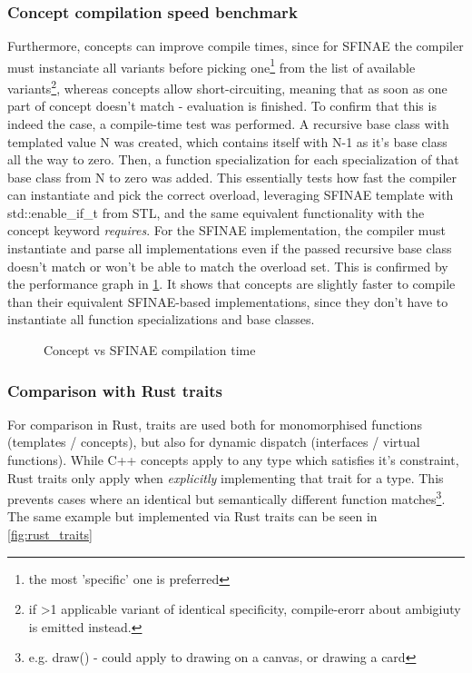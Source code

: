 \documentclass[
    english, %
]{VUMIFPSkursinis}
\begin{document}
\FloatBarrier
\subsubsection{Concept compilation speed benchmark}

Furthermore, concepts can improve compile times, since for SFINAE the compiler must instanciate all variants before picking one\footnote{the most 'specific' one is preferred} from the list of available variants\footnote{if >1 applicable variant of identical specificity, compile-erorr about ambigiuty is emitted instead.}, whereas concepts allow short-circuiting, meaning that as soon as one part of concept doesn't match - evaluation is finished. To confirm that this is indeed the case, a compile-time test was performed. A recursive base class with templated value N was created, which contains itself with N-1 as it's base class all the way to zero. Then, a function specialization for each specialization of that base class from N to zero was added. This essentially tests how fast the compiler can instantiate and pick the correct overload, leveraging SFINAE template with std::enable\_if\_t from STL, and the same equivalent functionality with the concept keyword \textit{requires}. For the SFINAE implementation, the compiler must instantiate and parse all implementations even if the passed recursive base class doesn't match or won't be able to match the overload set. This is confirmed by the performance graph in \cref{fig:concept_performance}. It shows that concepts are slightly faster to compile than their equivalent SFINAE-based implementations, since they don't have to instantiate all function specializations and base classes.

\begin{figure}[!htbp]
    \begin{center}
        \scalebox{.9}{
            
        }
    \end{center}
    \caption{Concept vs SFINAE compilation time}
    \label{fig:concept_performance}
\end{figure}

\FloatBarrier
\subsubsection{Comparison with Rust traits}

For comparison in Rust, traits are used both for monomorphised functions (templates / concepts), but also
for dynamic dispatch (interfaces / virtual functions). While C++ concepts apply to any type which
satisfies it's constraint, Rust traits only apply when \textit{explicitly} implementing that trait for a type.
This prevents cases where an identical but semantically different function matches\footnote{e.g. draw() - could apply to drawing on a canvas, or drawing a card}. The same example but implemented via Rust traits can be seen in \cref{fig:rust_traits}
\end{document}
